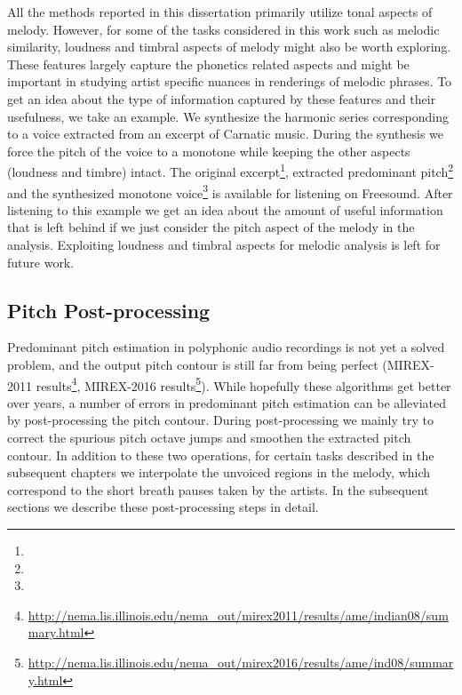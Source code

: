 {All the methods reported in this dissertation primarily utilize tonal aspects of melody. However, for some of the tasks considered in this work such as melodic similarity, loudness and timbral aspects of melody might also be worth exploring. These features largely capture the phonetics related aspects and might be important in studying artist specific nuances in renderings of melodic phrases. To get an idea about the type of information captured by these features and their usefulness, we take an example. We synthesize the harmonic series corresponding to a voice extracted from an excerpt of Carnatic music. During the synthesis we force the pitch of the voice to a monotone while keeping the other aspects (loudness and timbre) intact. The original excerpt\footnote{}, extracted predominant pitch\footnote{} and the synthesized monotone voice\footnote{} is available for listening on Freesound. After listening to this example we get an idea about the amount of useful information that is left behind if we just consider the pitch aspect of the melody in the analysis. Exploiting loudness and timbral aspects for melodic analysis is left for future work.



\subsection{Pitch Post-processing}
\label{sec:data_preprocessing_pitch_postprocessing}

Predominant pitch estimation in polyphonic audio recordings is not yet a solved problem, and the output pitch contour is still far from being perfect (MIREX-2011 results\footnote{\url{http://nema.lis.illinois.edu/nema_out/mirex2011/results/ame/indian08/summary.html}}, MIREX-2016 results\footnote{\url{http://nema.lis.illinois.edu/nema_out/mirex2016/results/ame/ind08/summary.html}}). While hopefully these algorithms get better over years, a number of errors in predominant pitch estimation can be alleviated by post-processing the pitch contour. During post-processing we mainly try to correct the spurious pitch octave jumps and smoothen the extracted pitch contour. In addition to these two operations, for certain tasks described in the subsequent chapters we interpolate the unvoiced regions in the melody, which correspond to the short breath pauses taken by the artists. In the subsequent sections we describe these post-processing steps in detail.

}
